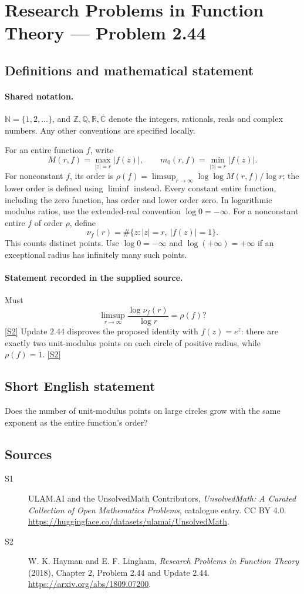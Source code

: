 \documentclass[11pt]{article}
\newcommand{\sref}[2]{\hyperlink{source:#1:#2}{[S#2]}}
\begin{document}
\section{Research Problems in Function Theory — Problem 2.44}\label{statement}

\subsection{Definitions and mathematical statement}

\paragraph{Shared notation.}$\mathbb N=\{1,2,\ldots\}$, and $\mathbb Z,\mathbb Q,\mathbb R,\mathbb C$ denote the integers, rationals, reals and complex numbers. Any other conventions are specified locally.


For an entire function $f$, write
\[
 M(r,f)=\max_{|z|=r}|f(z)|,\qquad m_0(r,f)=\min_{|z|=r}|f(z)|.
\]
For nonconstant $f$, its order is $\rho(f)=\limsup_{r\to\infty}\log\log M(r,f)/\log r$;
the lower order is defined using $\liminf$ instead. Every constant entire function, including the zero function, has order and lower order zero. In logarithmic modulus ratios, use the extended-real convention $\log0=-\infty$.
For a nonconstant entire $f$ of order $\rho$, define
\[\nu_f(r)=\#\{z:|z|=r,\ |f(z)|=1\}.\]
This counts distinct points. Use $\log0=-\infty$ and $\log(+\infty)=+\infty$ if an exceptional radius has infinitely many such points.

\paragraph{Statement recorded in the supplied source.}
Must
\[\limsup_{r\to\infty}\frac{\log\nu_f(r)}{\log r}=\rho(f)?\] \sref{statement}{2}
Update 2.44 disproves the proposed identity with $f(z)=e^z$: there are exactly two unit-modulus points on each circle of positive radius, while $\rho(f)=1$. \sref{statement}{2}
\subsection{Short English statement}
Does the number of unit-modulus points on large circles grow with the same exponent as the entire function's order?
\subsection{Sources}
\begin{description}
\item[\hypertarget{source:statement:1}{S1}] ULAM.AI and the UnsolvedMath Contributors, \emph{UnsolvedMath: A Curated Collection of Open Mathematics Problems}, catalogue entry. CC BY 4.0. \url{https://huggingface.co/datasets/ulamai/UnsolvedMath}.
\item[\hypertarget{source:statement:2}{S2}] W. K. Hayman and E. F. Lingham, \emph{Research Problems in Function Theory} (2018), Chapter 2, Problem 2.44 and Update 2.44. \url{https://arxiv.org/abs/1809.07200}.
\end{description}
\label{end:statement}
\end{document}
